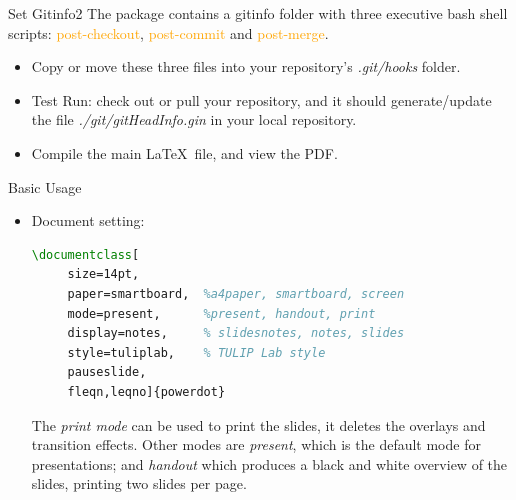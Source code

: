 \documentclass[
 size=14pt,
 paper=smartboard,  %
 mode=present, 		%
 display=slides, 	%
 style=tuliplab,  	%
 pauseslide,
 fleqn,leqno]{powerdot}
\begin{document}
\begin{slide}[method=direct]{Set Gitinfo2}
The package contains a gitinfo folder
with three executive bash shell scripts:
\textcolor{orange}{post-checkout},
\textcolor{orange}{post-commit} and
\textcolor{orange}{post-merge}.

\begin{itemize}
    \item  Copy or move these three files
           into your repository's \textit{.git/hooks} folder.
    \item Test Run: check out or pull your repository,
          and it should generate/update the file \textit{./git/gitHeadInfo.gin}
          in your local repository.
    \item Compile the main \LaTeX\ file, and view the PDF.
\end{itemize}

\end{slide}

\begin{slide}[method=direct]{Basic Usage}
\begin{itemize}
  \item Document setting:
  \begin{lstlisting}[language=TeX]
  \documentclass[
     size=14pt,
     paper=smartboard,  %a4paper, smartboard, screen
     mode=present, 		%present, handout, print
     display=notes, 	% slidesnotes, notes, slides
     style=tuliplab,  	% TULIP Lab style
     pauseslide,
     fleqn,leqno]{powerdot}
 \end{lstlisting}
 The \textit{print mode} can be used to print the slides,
 it deletes the overlays and transition effects.
 Other modes are \textit{present},
 which is the default mode for presentations;
 and \textit{handout} which
 produces a black and white overview of the slides,
 printing two slides per page.
 \end{itemize}
 \end{slide}
\end{document}
